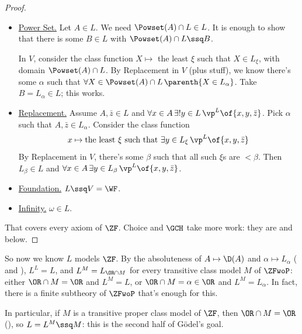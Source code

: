 \begin{proof}
\begin{itemize}
        \item \underline{Power Set.} Let $A \in L$. We need $\Powset(A) \cap L \in L$. It is enough to show that there is some $B \in L$ with $\Powset(A) \cap L \ssq B$.

        In $V$, consider the class function $X \mapsto$ the least $\xi$ such that $X \in L_{\xi}$, with domain $\Powset(A) \cap L$. By Replacement in $V$ (plus stuff), we know there's some $\alpha$ such that $\forall X \in \Powset(A) \cap L \, \parenth{X \in L_{\alpha}}$. Take $B = L_{\alpha} \in L$; this works.

        \item \underline{Replacement.} Assume $A, \bar{z} \in L$ and $\forall x \in A \, \exists! y \in L \, \vp^L\of{x, y, \bar{z}}$. Pick $\alpha$ such that $A, \bar{z} \in L_{\alpha}$. Consider the class function
        \begin{align*}
            x \mapsto \text{the least $\xi$ such that } \exists y \in L_{\xi} \, \vp^L\of{x, y, \bar{z}}
        \end{align*}
        By Replacement in $V$, there's some $\beta$ such that all such $\xi$s are $< \beta$. Then $L_{\beta} \in L$ and $\forall x \in A \, \exists y \in L_{\beta} \, \vp^L\of{x, y, \bar{z}}$.

        \item \underline{Foundation.} $L \ssq V = \WF$.

        \item \underline{Infinity.} $\omega \in L$.
    \end{itemize}
    That covers every axiom of $\ZF$. Choice and $\GCH$ take more work: they are  and  below.
\end{proof}


So now we know $L$ models $\ZF$. By the absoluteness of $A \mapsto \D(A)$ and $\alpha \mapsto L_{\alpha}$ ( and ), $L^L = L$, and $L^M = L_{\OR \cap M}$ for every transitive class model $M$ of $\ZFwoP$: either $\OR \cap M = \OR$ and $L^M = L$, or $\OR \cap M = \alpha \in \OR$ and $L^M = L_{\alpha}$. In fact, there is a finite subtheory of $\ZFwoP$ that's enough for this.

In particular, if $M$ is a transitive proper class model of $\ZF$, then $\OR \cap M = \OR$ (), so $L = L^M \ssq M$: this is the second half of Gödel's goal.

